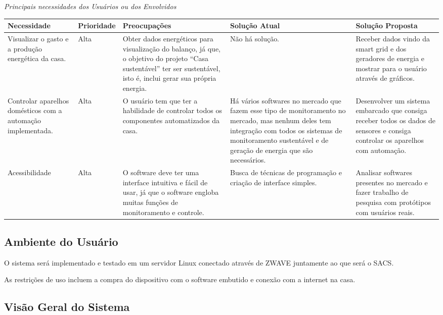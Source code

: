 \textit{Principais necessidades dos Usuários ou dos Envolvidos}

\begin{longtable}{|m{2.75cm}|m{2cm}|m{3cm}|m{4cm}|m{4cm}|}
	\hline \textbf{Necessidade} & \textbf{Prioridade} & \textbf{Preocupações} & \textbf{Solução Atual} & \textbf{Solução Proposta}\\
	\hline 
Visualizar o gasto e a produção energética da casa.
&
Alta
&
Obter dados energéticos para visualização do balanço, já que, o objetivo do projeto “Casa sustentável” ter ser sustentável, isto é, inclui gerar sua própria energia.
&
Não há solução.
&
Receber dados vindo da smart grid e dos geradores de energia e mostrar para o usuário através de gráficos.
\\
	\hline 
Controlar aparelhos domésticos com a automação implementada.
&
Alta
&
O usuário tem que ter a habilidade de controlar todos os componentes automatizados da casa.
&
Há vários softwares no mercado que fazem esse tipo de monitoramento no mercado, mas nenhum deles tem integração com todos os sistemas de monitoramento sustentável e de geração de energia que são necessários.
&
Desenvolver um sistema embarcado que consiga receber todos os dados de sensores e consiga controlar os aparelhos com automação.
\\
	\hline
Acessibilidade
&
Alta
&
O software deve ter uma interface intuitiva e fácil de usar, já que o software engloba muitas funções de monitoramento e controle.
&
Busca de técnicas de programação e criação de interface simples.
&
Analisar softwares presentes no mercado e fazer trabalho de pesquisa com protótipos com usuários reais.
\\
	\hline
\end{longtable}

\subsection{Ambiente do Usuário}

	O sistema será implementado e testado em um servidor Linux conectado através de \gls{ZWAVE} juntamente ao que será o \gls{SACS}.

	As restrições de uso incluem a compra do dispositivo com o software embutido e conexão com a internet na casa.

\subsection{Visão Geral do Sistema}

